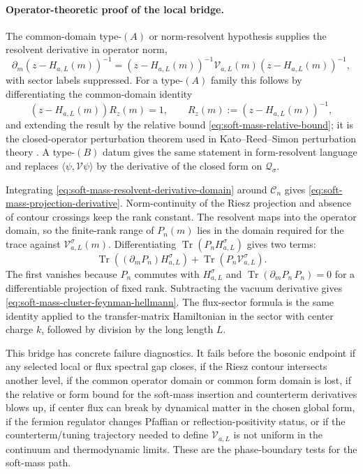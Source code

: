 \paragraph{Operator-theoretic proof of the local bridge.}
The common-domain type-\((A)\) or norm-resolvent hypothesis supplies the
resolvent derivative in operator norm,
\begin{equation}
  \partial_m(z-H_{a,L}(m))^{-1}
  =
  (z-H_{a,L}(m))^{-1}\mathcal V_{a,L}(m)(z-H_{a,L}(m))^{-1},
  \label{eq:soft-mass-resolvent-derivative-domain}
\end{equation}
with sector labels suppressed.  For a type-\((A)\) family this follows by
differentiating the common-domain identity
\[
  (z-H_{a,L}(m))R_z(m)=1,
  \qquad
  R_z(m):=(z-H_{a,L}(m))^{-1},
\]
and extending the result by the relative bound
\eqref{eq:soft-mass-relative-bound}; it is the closed-operator perturbation
theorem used in Kato--Reed--Simon perturbation theory
\cite{Kato1966Perturbation,ReedSimon1975II}.  A type-\((B)\) datum
gives the same statement in form-resolvent language and replaces
\(\langle\psi,\mathcal V\psi\rangle\) by the derivative of the closed form on
\(\mathcal Q_{\sigma}\).

Integrating \eqref{eq:soft-mass-resolvent-derivative-domain} around
\(\mathcal C_n\) gives
\eqref{eq:soft-mass-projection-derivative}.  Norm-continuity of the Riesz
projection and absence of contour crossings keep the rank constant.  The
resolvent maps into the operator domain, so the finite-rank range of
\(P_n(m)\) lies in the domain required for the trace against
\(\mathcal V_{a,L}^{\sigma}(m)\).  Differentiating
\(\operatorname{Tr}(P_nH_{a,L}^{\sigma})\) gives two terms:
\[
  \operatorname{Tr}((\partial_mP_n)H_{a,L}^{\sigma})
  +
  \operatorname{Tr}(P_n\mathcal V_{a,L}^{\sigma}).
\]
The first vanishes because \(P_n\) commutes with \(H_{a,L}^{\sigma}\) and
\(\operatorname{Tr}(\partial_mP_n\,P_n)=0\) for a differentiable projection of
fixed rank.  Subtracting the vacuum derivative gives
\eqref{eq:soft-mass-cluster-feynman-hellmann}.  The flux-sector formula is
the same identity applied to the transfer-matrix Hamiltonian in the sector
with center charge \(k\), followed by division by the long length \(L\).

This bridge has concrete failure diagnostics.  It fails before the bosonic
endpoint if any selected local or flux spectral gap closes, if the Riesz
contour intersects another level, if the common operator domain or common
form domain is lost, if the relative or form bound for the soft-mass
insertion and counterterm derivatives blows up, if center flux can break by
dynamical matter in the chosen global form, if the fermion regulator changes
Pfaffian or reflection-positivity status, or if the counterterm/tuning
trajectory needed to define \(\mathcal V_{a,L}\) is not uniform in the
continuum and thermodynamic limits.  These are the phase-boundary tests for
the soft-mass path.

